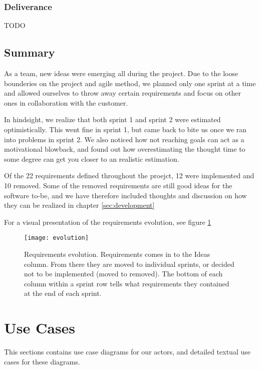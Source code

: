 \documentclass{report}
\begin{document}
\subsubsection{Deliverance}
TODO

\subsection{Summary} \label{sec:requirements_evolution_summary}

\par As a team, new ideas were emerging all during the project. Due to the loose bounderies on the project and agile method, we planned only one sprint at a time and allowed ourselves to throw away certain requirements and focus on other ones in collaboration with the customer.
\par In hindsight, we realize that both sprint 1 and sprint 2 were estimated optimistically. This went fine in sprint 1, but came back to bite us once we ran into problems in sprint 2. We also noticed how not reaching goals can act as a motivational blowback, and found out how overestimating the thought time to some degree can get you closer to an realistic estimation.
\par Of the 22 requirements defined throughout the proejct, 12 were implemented and 10 removed. Some of the removed requirements are still good ideas for the software to-be, and we have therefore included thoughts and discussion on how they can be realized in chapter \ref{sec:development}
\par For a visual presentation of the requirements evolution, see figure \ref{fig:evolution}

\begin{figure}
    \centering
    \texttt{[image: evolution]}
    \caption{Requirements evolution. Requirements comes in to the Ideas column. From there they are moved to individual sprints, or decided not to be implemented (moved to removed). The bottom of each column within a sprint row tells what requirements they contained at the end of each sprint.}
    \label{fig:evolution}
\end{figure}






\newpage
\section{Use Cases} \label{sec:use_cases}
This sections contains use case diagrams for our actors, and detailed textual use cases for these diagrams. 
\end{document}
